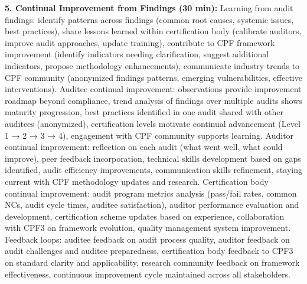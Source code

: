 \documentclass[11pt,a4paper]{article}
\begin{document}
\textbf{5. Continual Improvement from Findings (30 min):} Learning from audit findings: identify patterns across findings (common root causes, systemic issues, best practices), share lessons learned within certification body (calibrate auditors, improve audit approaches, update training), contribute to CPF framework improvement (identify indicators needing clarification, suggest additional indicators, propose methodology enhancements), communicate industry trends to CPF community (anonymized findings patterns, emerging vulnerabilities, effective interventions). Auditee continual improvement: observations provide improvement roadmap beyond compliance, trend analysis of findings over multiple audits shows maturity progression, best practices identified in one audit shared with other auditees (anonymized), certification levels motivate continual advancement (Level 1 → 2 → 3 → 4), engagement with CPF community supports learning. Auditor continual improvement: reflection on each audit (what went well, what could improve), peer feedback incorporation, technical skills development based on gaps identified, audit efficiency improvements, communication skills refinement, staying current with CPF methodology updates and research. Certification body continual improvement: audit program metrics analysis (pass/fail rates, common NCs, audit cycle times, auditee satisfaction), auditor performance evaluation and development, certification scheme updates based on experience, collaboration with CPF3 on framework evolution, quality management system improvement. Feedback loops: auditee feedback on audit process quality, auditor feedback on audit challenges and auditee preparedness, certification body feedback to CPF3 on standard clarity and applicability, research community feedback on framework effectiveness, continuous improvement cycle maintained across all stakeholders.
\end{document}
